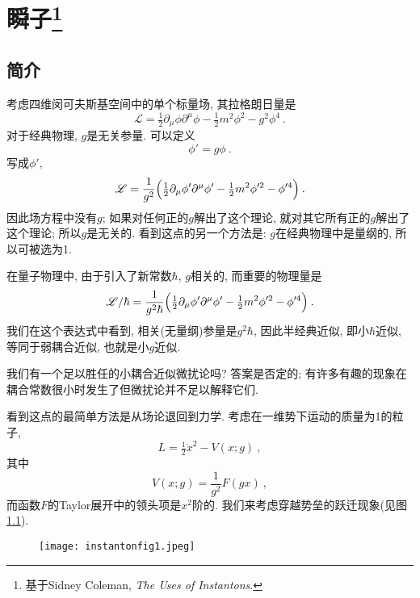 
\renewcommand*\thesection{\arabic{section}}
\setcounter{section}{0}%
\setcounter{chapter}{0}


\chapter[瞬子]{瞬子\footnote{基于Sidney Coleman, {\textit{The Uses of Instantons}}.}}

\section{简介} \label{instanton:sec1}

考虑四维闵可夫斯基空间中的单个标量场, 其拉格朗日量是
\begin{equation}
    \mathscr{L}=\tfrac{1}{2}\partial_{\mu}\phi \partial^{\mu}\phi
    -\tfrac{1}{2}m^{2}\phi^{2}-g^{2}\phi^{4} \:.
\end{equation}
对于经典物理, $g$是无关参量. 可以定义
\begin{equation}
    \phi'=g\phi\:.
\end{equation}
写成$\phi'$, 
\begin{equation}
    \mathscr{L}=\frac{1}{g^{2}}\Bigl(\tfrac{1}{2}\partial_{\mu}\phi' \partial^{\mu}\phi'
    -\tfrac{1}{2}m^{2}\phi'^{2}-\phi'^{4} \Bigr)\:.
\end{equation}
因此场方程中没有$g$; 如果对任何正的$g$解出了这个理论, 就对其它所有正的$g$解出了这个理论; 所以$g$是无关的. 看到这点的另一个方法是: $g$在经典物理中是{}量纲的, 所以可被选为1.

在量子物理中, 由于引入了新常数$\hbar$, $g${}相关的, 而重要的物理量是
\begin{equation}
    \mathscr{L}/\hbar = \frac{1}{g^{2}\hbar}\Bigl(\tfrac{1}{2}\partial_{\mu}\phi' \partial^{\mu}\phi'
    -\tfrac{1}{2}m^{2}\phi'^{2}-\phi'^{4} \Bigr) \:.
\end{equation}
我们在这个表达式中看到, 相关(无量纲)参量是$g^{2}\hbar$, 因此半经典近似, 即小$\hbar$近似, 等同于弱耦合近似, 也就是小$g$近似.

我们有一个足以胜任的小耦合近似微扰论吗? 答案是否定的; 有许多有趣的现象在耦合常数很小时发生了但微扰论并不足以解释它们.

看到这点的最简单方法是从场论退回到力学. 考虑在一维势下运动的质量为1的粒子,
\begin{equation}
    L=\tfrac{1}{2}\dot{x}^{2}-V(x;g) \:, 
\end{equation}
其中
\begin{equation}
    V(x;g)=\frac{1}{g^{2}} F(gx) \:,
\end{equation}
而函数$F$的Taylor展开中的领头项是$x^{2}$阶的. 我们来考虑穿越势垒的跃迁现象(见图\ref{instantonfig1}). 
\begin{figure}[h]
    \centering
    \texttt{[image: instantonfig1.jpeg]}
    \caption{ \label{instantonfig1}}
  \end{figure}

